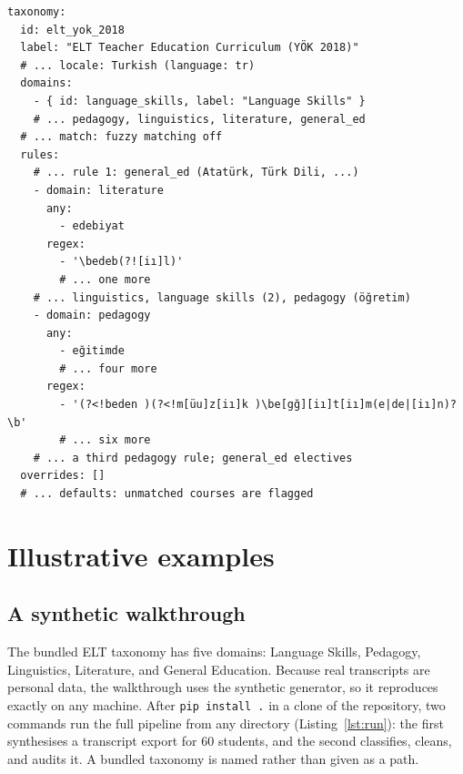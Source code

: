\documentclass[preprint,12pt,a4paper]{elsarticle}
\begin{document}
\begin{lstlisting}[float=!htbp,caption={Excerpt of the bundled ELT taxonomy (\texttt{elt\_yok\_2018.yaml}); lines starting with \texttt{\# ...} replace omitted lines, and inline comments are removed. Rules are evaluated in order; the pedagogy expression accepts \emph{e\u{g}itim} bare or with the endings \emph{-e}, \emph{-de}, and \emph{-in}, but not the possessive form in \emph{Beden E\u{g}itimi} (physical education). The full file has \eltRules{} rules with \eltKeywords{} keywords and \eltRegexes{} regular expressions (Table~\ref{tab:effort}).},label={lst:yaml}]
taxonomy:
  id: elt_yok_2018
  label: "ELT Teacher Education Curriculum (YÖK 2018)"
  # ... locale: Turkish (language: tr)
  domains:
    - { id: language_skills, label: "Language Skills" }
    # ... pedagogy, linguistics, literature, general_ed
  # ... match: fuzzy matching off
  rules:
    # ... rule 1: general_ed (Atatürk, Türk Dili, ...)
    - domain: literature
      any:
        - edebiyat
      regex:
        - '\bedeb(?![iı]l)'
        # ... one more
    # ... linguistics, language skills (2), pedagogy (öğretim)
    - domain: pedagogy
      any:
        - eğitimde
        # ... four more
      regex:
        - '(?<!beden )(?<!m[üu]z[iı]k )\be[gğ][iı]t[iı]m(e|de|[iı]n)?\b'
        # ... six more
    # ... a third pedagogy rule; general_ed electives
  overrides: []
  # ... defaults: unmatched courses are flagged
\end{lstlisting}

\section{Illustrative examples}
\label{sec:examples}

\subsection{A synthetic walkthrough}
\label{sec:walkthrough}

The bundled ELT taxonomy has five domains: Language Skills, Pedagogy, Linguistics, Literature, and General Education. Because real transcripts are personal data, the walkthrough uses the synthetic generator, so it reproduces exactly on any machine. After \texttt{pip install .} in a clone of the repository, two commands run the full pipeline from any directory (Listing~\ref{lst:run}): the first synthesises a transcript export for 60 students, and the second classifies, cleans, and audits it. A bundled taxonomy is named rather than given as a path.
\end{document}
